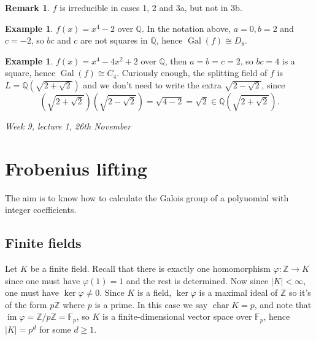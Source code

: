 \documentclass{article}
\newcommand{\F}{\mathbb{F}}
\newcommand{\Z}{\mathbb{Z}}
\newcommand{\Q}{\mathbb{Q}}
\newcommand{\Char}{\operatorname{char}}
\newcommand{\im}{\operatorname{im}}
\newcommand{\Gal}{\operatorname{Gal}}
\theoremstyle{definition}
\newtheorem{example}[defn]{Example}
\newtheorem{remark}[defn]{Remark}
\begin{document}
\begin{remark}
$f$ is irreducible in cases 1, 2 and 3a, but not in 3b.
\end{remark}

\begin{example}
$f(x)=x^4-2$ over $\Q$. In the notation above, $a=0, b=2$ and $c=-2$, so $bc$ and $c$ are not squares in $\Q$, hence $\Gal(f)\cong D_8$.
\end{example}

\begin{example}
$f(x)=x^4-4x^2+2$ over $\Q$, then $a=b=c=2$, so $bc=4$ is a square, hence $\Gal(f)\cong C_4$. Curiously enough, the splitting field of $f$ is $L=\Q\left(\sqrt{2+\sqrt 2}\right)$ and we don't need to write the extra $\sqrt{2-\sqrt 2}$, since
\[
\left(\sqrt{2+\sqrt 2}\right)\left(\sqrt{2-\sqrt 2}\right)=\sqrt{4-2}=\sqrt 2\in\Q\left(\sqrt{2+\sqrt 2}\right).
\]
\end{example}

\begin{flushright}
\textit{Week 9, lecture 1, 26th November}
\end{flushright}

\section{Frobenius lifting}
The aim is to know how to calculate the Galois group of a polynomial with integer coefficients.

\subsection{Finite fields}
Let $K$ be a finite field. Recall that there is exactly one homomorphism $\varphi:\Z\rightarrow K$ since one must have $\varphi(1)=1$ and the rest is determined. Now since $|K|<\infty$, one must have $\ker\varphi\neq 0$. Since $K$ is a field, $\ker\varphi$ is a maximal ideal of $\Z$ so it's of the form $p\Z$ where $p$ is a prime. In this case we say $\Char K=p$, and note that $\im\varphi=\Z/p\Z=\F_p$, so $K$ is a finite-dimensional vector space over $\F_p$, hence $|K|=p^d$ for some $d\geq 1$.
\end{document}
